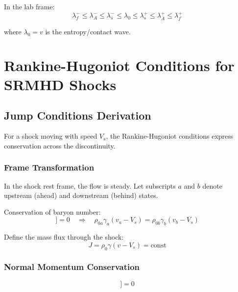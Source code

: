 \documentclass[12pt,a4paper]{article}
\begin{document}
In the lab frame:
\begin{equation}
\lambda_f^- \leq \lambda_A^- \leq \lambda_s^- \leq \lambda_0 \leq \lambda_s^+ \leq \lambda_A^+ \leq \lambda_f^+
\label{eq:lab_frame_ordering}
\end{equation}

where $\lambda_0 = v$ is the entropy/contact wave.

\section{Rankine-Hugoniot Conditions for SRMHD Shocks}

\subsection{Jump Conditions Derivation}

For a shock moving with speed $V_s$, the Rankine-Hugoniot conditions express
conservation across the discontinuity.

\subsubsection{Frame Transformation}

In the shock rest frame, the flow is steady. Let subscripts $a$ and $b$ denote
upstream (ahead) and downstream (behind) states.

Conservation of baryon number:
\begin{equation}
[\![ \rho_0 \gamma (v - V_s) ]\!] = 0 \quad \Rightarrow \quad
\rho_{0a} \gamma_a (v_a - V_s) = \rho_{0b} \gamma_b (v_b - V_s)
\label{eq:RH_mass}
\end{equation}

Define the mass flux through the shock:
\begin{equation}
J = \rho_0 \gamma (v - V_s) = \text{const}
\label{eq:mass_flux_def}
\end{equation}

\subsubsection{Normal Momentum Conservation}

\begin{equation}
[\![ \rho_0 h \gamma^2 (v - V_s) v_n + p_\text{tot} - \frac{b_n^2}{4\pi} ]\!] = 0
\label{eq:RH_momentum_n}
\end{equation}
\end{document}
